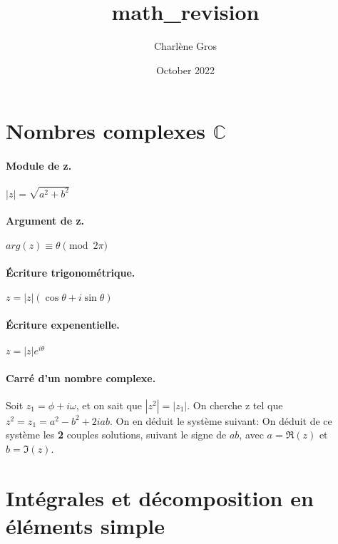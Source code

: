 \documentclass{article}
\title{math_revision}
\author{Charlène Gros}
\date{October 2022}
\begin{document}
\section*{Nombres complexes $\mathbb{C}$}
\paragraph{Module de z.} 
$|z|= \sqrt{a^2+b^2}$
\paragraph{Argument de z.} 
$arg(z) \equiv \theta \pmod{2\pi}$
\paragraph{Écriture trigonométrique.}
$z = |z|(\cos{\theta} + i\sin{\theta})$
\paragraph{Écriture expenentielle.}
$z = |z|e^{i\theta}$
\paragraph{Carré d'un nombre complexe.}
Soit  $z_{1} = \phi + i\omega$, et on sait que $|z^2| = |z_{1}|$.
On cherche z tel que  $z^2 = z_{1} = a^2-b^2+2iab$.
On en déduit le système suivant:
On déduit de ce système les \textbf{2} couples solutions, suivant le signe de $ab$, avec $a = \Re(z)$ et $b = \Im(z)$.

\section*{Intégrales et décomposition en éléments simple}
\end{document}
